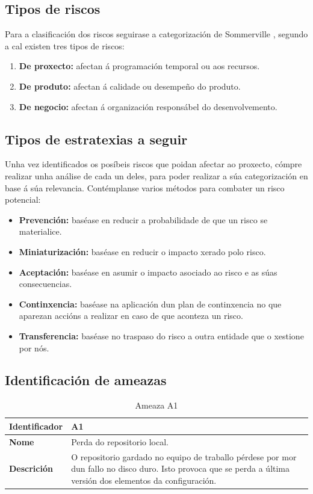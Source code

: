 \subsection{Tipos de riscos}

Para a clasificación dos riscos seguirase a categorización de Sommerville \cite{Sommerville}, segundo a cal existen tres tipos de riscos:

\begin{enumerate}
    \item \textbf{De proxecto:} afectan á programación temporal ou aos recursos.
    \item \textbf{De produto:} afectan á calidade ou desempeño do produto.
    \item \textbf{De negocio:} afectan á organización responsábel do desenvolvemento.
\end{enumerate}

\subsection{Tipos de estratexias a seguir}

Unha vez identificados os posíbeis riscos que poidan afectar ao proxecto, cómpre realizar unha análise de cada un deles, para poder realizar a súa categorización en base á súa relevancia. Contémplanse varios métodos para combater un risco potencial:

\begin{itemize}
    \item \textbf{Prevención:} baséase en reducir a probabilidade de que un risco se materialice.
    \item \textbf{Miniaturización:} baséase en reducir o impacto xerado polo risco.
    \item \textbf{Aceptación:} baséase en asumir o impacto asociado ao risco e as súas consecuencias.
    \item \textbf{Continxencia:} baséase na aplicación dun plan de continxencia no que aparezan accións a realizar en caso de que aconteza un risco.
    \item \textbf{Transferencia:} baséase no traspaso do risco a outra entidade que o xestione por nós.
\end{itemize}

\subsection{Identificación de ameazas}

\begin{table}[H]
\caption{Ameaza A1}
\label{A1}
\begin{tabularx}{\textwidth}{|l|X|}
\hline
\textbf{Identificador} & A1 \\ \hline
\textbf{Nome} & Perda do repositorio local. \\ \hline
\textbf{Descrición} & O repositorio gardado no equipo de traballo pérdese por mor dun fallo no disco duro. Isto provoca que se perda a última versión dos elementos da configuración. \\ \hline
\end{tabularx}
\end{table}

